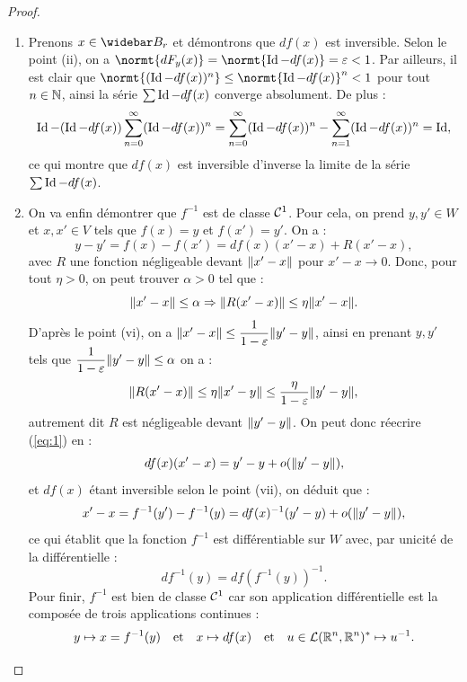 \begin{proof}
\begin{enumerate}[label=(\roman*)]
\item 
Prenons $x \in \Bfr$ et démontrons que $df(x)$ est inversible. 
Selon le point (ii), on a $\normt{dF_y(x)} = \normt{\id - df(x)} = \veps < 1$.
Par ailleurs, il est clair que $\normt{(\id-df(x))^n} \leq \normt{\id - df(x)}^n < 1$ pour tout $n \in \mathbb{N}$, ainsi la série $\sum \operatorname{Id} - df(x)$ converge
absolument. De plus :
\[ \operatorname{Id} - (\operatorname{Id} - df(x)) \sum_{n=0}^{\infty} (\operatorname{Id} - df(x))^n =  \sum_{n=0}^{\infty} (\operatorname{Id} - df(x))^n -  \sum_{n=1}^{\infty} (\operatorname{Id} - df(x))^n = \operatorname{Id} , \]
ce qui montre que $df(x)$ est inversible d'inverse la limite de la série $\sum \operatorname{Id} - df(x)$.

\item
On va enfin démontrer que $f^{-1}$ est de classe $\mathcal{C}^1$. Pour cela, on prend $y, y' \in W$ et $x, x' \in V$ tels que $f(x)=y$ et $f(x')=y'$.
On a :
\begin{equation} y - y' = f(x) - f(x') = df(x)(x'-x) + R(x'-x) , \label{eq:1} \end{equation}
avec $R$ une fonction négligeable devant $\lVert x'-x\rVert$ pour $x'-x \to 0$. Donc, pour tout $\eta >0$, on peut trouver $\alpha >0$ tel que :
\[ \lVert x'-x\rVert \leq \alpha \Rightarrow \lVert R(x'-x)\rVert \leq \eta \lVert x'-x\rVert . \]
D'après le point (vi), on a $\lVert x'-x\rVert \leq \dfrac1{1-\varepsilon} \lVert y'-y\rVert$, ainsi en prenant $y, y'$ tels que $\dfrac1{1-\varepsilon} \lVert y'-y\rVert \leq \alpha$
on a :
\[ \lVert R(x'-x)\rVert \leq \eta \lVert x'-y\rVert \leq \dfrac{\eta}{1-\varepsilon} \lVert y'-y\rVert, \]
autrement dit $R$ est négligeable devant $\lVert y'-y\rVert$. On peut donc réecrire (\ref{eq:1}) en :
\[ df(x)(x'-x) = y'-y + o(\lVert y'-y\rVert) , \]
et $df(x)$ étant inversible selon le point (vii), on déduit que :
\[ x'-x = f^{-1}(y') - f^{-1}(y) = df(x)^{-1}(y'-y) + o(\lVert y'-y\rVert) , \]
ce qui établit que la fonction $ f^{-1}$ est différentiable sur $W$ avec, par unicité de la différentielle :
\[ df^{-1}(y) = df(f^{-1}(y))^{-1} . \]
Pour finir, $f^{-1}$ est bien de classe $\mathcal{C}^1$ car son application différentielle est la composée de trois applications continues :
\[ y \mapsto x=f^{-1}(y) \quad \text{et} \quad x \mapsto df(x) \quad \text{et} \quad u \in \mathcal{L}(\mathbb{R}^n, \mathbb{R}^n)^{\ast} \mapsto u^{-1} . \]
\end{enumerate}
\end{proof}

